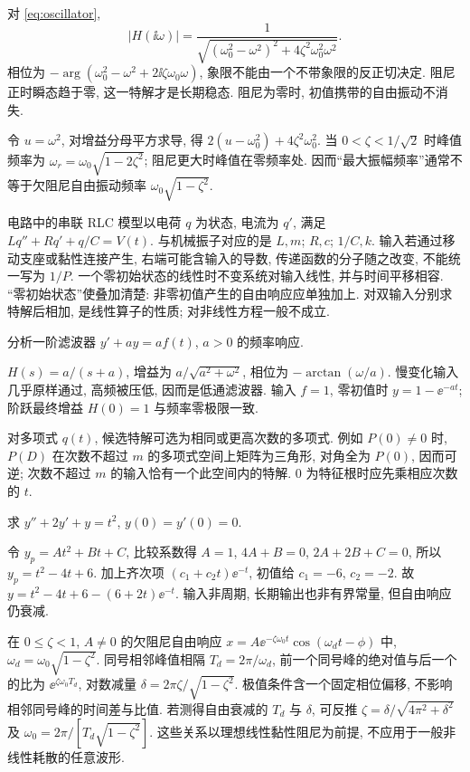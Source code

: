 对 \eqref{eq:oscillator},
\[
|H(\ii\omega)|=\frac1{\sqrt{(\omega_0^2-\omega^2)^2+4\zeta^2\omega_0^2\omega^2}}.
\]
相位为 $-\arg(\omega_0^2-\omega^2+2\ii\zeta\omega_0\omega)$, 象限不能由一个不带象限的反正切决定. 阻尼正时瞬态趋于零, 这一特解才是长期稳态. 阻尼为零时, 初值携带的自由振动不消失.

令 $u=\omega^2$, 对增益分母平方求导, 得 $2(u-\omega_0^2)+4\zeta^2\omega_0^2$. 当 $0<\zeta<1/\sqrt2$ 时峰值频率为 $\omega_r=\omega_0\sqrt{1-2\zeta^2}$; 阻尼更大时峰值在零频率处. 因而“最大振幅频率”通常不等于欠阻尼自由振动频率 $\omega_0\sqrt{1-\zeta^2}$.

电路中的串联 RLC 模型以电荷 $q$ 为状态, 电流为 $q'$, 满足 $Lq''+Rq'+q/C=V(t)$. 与机械振子对应的是 $L,m$; $R,c$; $1/C,k$. 输入若通过移动支座或黏性连接产生, 右端可能含输入的导数, 传递函数的分子随之改变, 不能统一写为 $1/P$.
一个零初始状态的线性时不变系统对输入线性, 并与时间平移相容. “零初始状态”使叠加清楚: 非零初值产生的自由响应应单独加上. 对双输入分别求特解后相加, 是线性算子的性质; 对非线性方程一般不成立.
\begin{example}分析一阶滤波器 $y'+ay=af(t)$, $a>0$ 的频率响应.\end{example}
\begin{solution}
$H(s)=a/(s+a)$, 增益为 $a/\sqrt{a^2+\omega^2}$, 相位为 $-\arctan(\omega/a)$. 慢变化输入几乎原样通过, 高频被压低, 因而是低通滤波器. 输入 $f=1$, 零初值时 $y=1-\ee^{-at}$; 阶跃最终增益 $H(0)=1$ 与频率零极限一致.
\end{solution}

对多项式 $q(t)$, 候选特解可选为相同或更高次数的多项式. 例如 $P(0)\ne0$ 时, $P(D)$ 在次数不超过 $m$ 的多项式空间上矩阵为三角形, 对角全为 $P(0)$, 因而可逆; 次数不超过 $m$ 的输入恰有一个此空间内的特解. $0$ 为特征根时应先乘相应次数的 $t$.
\begin{example}求 $y''+2y'+y=t^2$, $y(0)=y'(0)=0$.\end{example}
\begin{solution}
令 $y_p=At^2+Bt+C$, 比较系数得 $A=1$, $4A+B=0$, $2A+2B+C=0$, 所以 $y_p=t^2-4t+6$. 加上齐次项 $(c_1+c_2t)\ee^{-t}$, 初值给 $c_1=-6$, $c_2=-2$. 故 $y=t^2-4t+6-(6+2t)\ee^{-t}$. 输入非周期, 长期输出也非有界常量, 但自由响应仍衰减.
\end{solution}
在 $0\le\zeta<1$, $A\ne0$ 的欠阻尼自由响应 $x=A\ee^{-\zeta\omega_0t}\cos(\omega_dt-\phi)$ 中, $\omega_d=\omega_0\sqrt{1-\zeta^2}$. 同号相邻峰值相隔 $T_d=2\pi/\omega_d$, 前一个同号峰的绝对值与后一个的比为 $\ee^{\zeta\omega_0T_d}$, 对数减量
$\delta=2\pi\zeta/\sqrt{1-\zeta^2}$.
极值条件含一个固定相位偏移, 不影响相邻同号峰的时间差与比值. 若测得自由衰减的 $T_d$ 与 $\delta$, 可反推 $\zeta=\delta/\sqrt{4\pi^2+\delta^2}$ 及 $\omega_0=2\pi/[T_d\sqrt{1-\zeta^2}]$. 这些关系以理想线性黏性阻尼为前提, 不应用于一般非线性耗散的任意波形.

